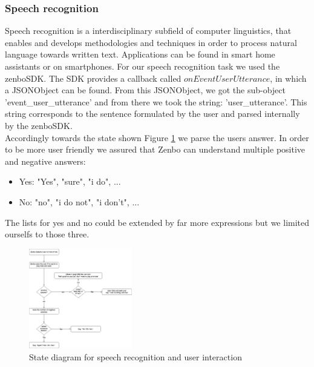 \documentclass[conference]{IEEEtran}
\begin{document}
\subsubsection{Speech recognition} \label{sec:speechreconition}
Speech recognition is a interdisciplinary subfield of computer linguistics, that enables and develops methodologies and techniques in order to process 
natural language towards written text. \cite{b4}  Applications can be found in smart home assistants or on smartphones.
For our speech recognition task we used the zenboSDK. The SDK provides a callback called $onEventUserUtterance$, in which a JSONObject can be found.
From this JSONObject, we got the sub-object 'event\_user\_utterance' and from there we took the string: 'user\_utterance'. This string 
corresponds to the sentence formulated by the user and parsed internally by the zenboSDK.\\
Accordingly towards the state shown Figure \ref{fig:zenboSpeech} we parse the users answer.
In order to be more user friendly we assured that Zenbo can understand multiple positive and negative answers:
\begin{itemize}
	\item Yes: "Yes", "sure", "i do", ...
	\item No: "no", "i do not", "i don't", ...
\end{itemize}
The lists for yes and no could be extended by far more expressions but we limited ourselfs to those three.\\
\begin{figure}  \label{fig:zenboSpeech}
	\begin{center}
		\includegraphics[width=0.4\textwidth]{pics/ZenboSpeech.png}
	\end{center}
	\caption{State diagram for speech recognition and user interaction}
\end{figure}\\
\end{document}
